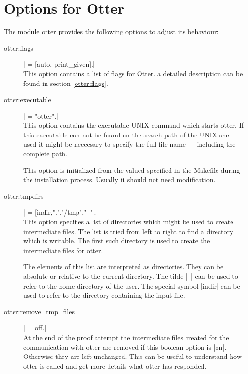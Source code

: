 \section{Options for Otter}

The module otter provides the following options to adjust its behaviour:

\begin{description}
  \item [otter:flags] | = [auto,-print_given].|
    \\
    This option contains a list of flags for Otter. a detailed description can
    be found in section \ref{otter:flags}.

  \item [otter:executable] | = "otter".|
    \\
    This option contains the executable UNIX command which starts otter. If
    this executable can not be found on the search path of the UNIX shell used
    it might be neccesary to specify the full file name --- including the
    complete path.

    This option is initialized from the valued specified in the Makefile
    during the installation process. Usually it should not need modification.

  \item [otter:tmpdirs] | = [indir,".","/tmp","~"].|
    \\
    This option specifies a list of directories which might be used to create
    intermediate files. The list is tried from left to right to find a
    directory which is writable. The first such directory is used to create
    the intermediate files for otter.

    The elements of this list are interpreted as directories. They can be
    absolute or relative to the current directory. The tilde |~| can be used
    to refer to the home directory of the user. The special symbol |indir| can
    be used to refer to the directory containing the input file.

  \item [otter:remove\_tmp\_files] | = off.|
    \\
    At the end of the proof attempt the intermediate files created for the
    communication with otter are removed if this boolean option is
    |on|. Otherwise they are left unchanged. This can be useful to understand
    how otter is called and get more details what otter has responded.

\end{description}



